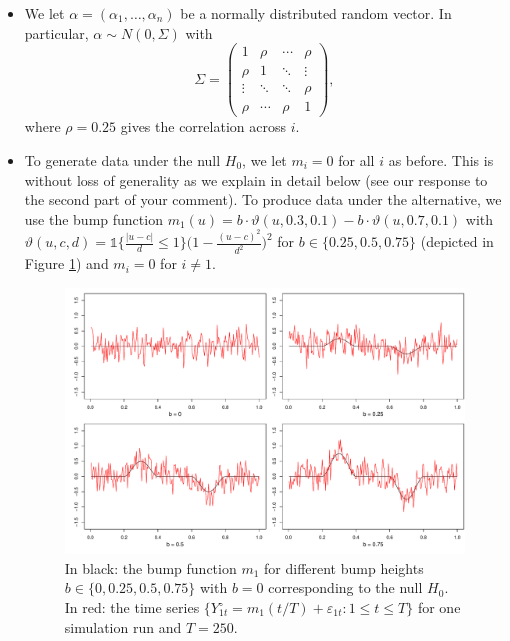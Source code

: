 \documentclass[a4paper,12pt]{article}
\newcommand{\ind}{\mathbb{1}}
\begin{document}
\begin{enumerate}[label=\arabic*.,leftmargin=0.6cm]
\begin{enumerate}[label=(\roman*),leftmargin=0.75cm,topsep=0pt]
\begin{itemize}[leftmargin=0.45cm,itemsep=0pt,topsep=0pt]
\item We let $\alpha = (\alpha_1,\ldots,\alpha_n)$ be a normally distributed random vector. In particular, $\alpha \sim N(0,\Sigma)$ with
\[ \Sigma =
\begin{pmatrix}
1      & \rho   & \cdots & \rho   \\
\rho   & 1      & \ddots & \vdots \\
\vdots & \ddots & \ddots & \rho   \\
\rho   & \cdots & \rho   & 1
\end{pmatrix},
\]
where $\rho = 0.25$ gives the correlation across $i$.

\item To generate data under the null $H_0$, we let $m_i = 0$ for all $i$ as before. This is without loss of generality as we explain in detail below (see our response to the second part of your comment). To produce data under the alternative, we use the bump function $m_1(u) =  b \cdot  \vartheta(u, 0.3, 0.1) - b  \cdot  \vartheta(u,0.7, 0.1)$ with $\vartheta(u,c,d) =  \ind\big\{\frac{|u - c|}{d}\leq 1\big\} \big(1 - \frac{(u - c)^2}{d^2}\big)^2$ for $b \in \{ 0.25, 0.5, 0.75 \}$ %
(depicted in Figure \ref{fig:bump_function}) and $m_i = 0$ for $i \neq 1$.

\begin{figure}[t!]
\includegraphics[width=\textwidth]{../output/bump_function.pdf}
\caption{In black: the bump function $m_1$ for different bump heights $b \in \{0, 0.25, 0.5, 0.75\}$ with $b=0$ corresponding to the null $H_0$. In red: the time series $\{Y_{1t}^\circ = m_1(t/T) + \varepsilon_{1t}: 1 \le t \le T\}$ for one simulation run and $T=250$.}\label{fig:bump_function}


\end{figure}
\end{itemize}
\end{enumerate}
\end{enumerate}
\end{document}
